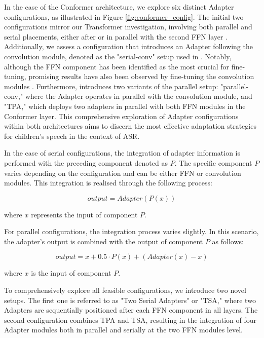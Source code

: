 In the case of the Conformer architecture, we explore six distinct Adapter configurations, as illustrated in Figure \ref{fig:conformer_config}. The initial two configurations mirror our Transformer investigation, involving both parallel and serial placements, either after or in parallel with the second FFN layer \cite{chen2023efficient}. Additionally, we assess a configuration that introduces an Adapter following the convolution module, denoted as the "serial-conv" setup used in \cite{10095837}. Notably, although the FFN component has been identified as the most crucial for fine-tuning, promising results have also been observed by fine-tuning the convolution modules \cite{chen2023efficient}. Furthermore, \cite{chen2023efficient} introduces two variants of the parallel setup: "parallel-conv," where the Adapter operates in parallel with the convolution module, and "TPA," which deploys two adapters in parallel with both FFN modules in the Conformer layer. This comprehensive exploration of Adapter configurations within both architectures aims to discern the most effective adaptation strategies for children's speech in the context of ASR. 


In the case of serial configurations, the integration of adapter information is performed with the preceding component denoted as $P$. The specific component $P$ varies depending on the configuration and can be either FFN or convolution modules. This integration is realised through the following process:

\begin{equation}
    output =  Adapter(P(x))
\end{equation}

where $x$ represents the input of component $P$.

For parallel configurations, the integration process varies slightly. In this scenario, the adapter's output is combined with the output of component $P$ as follows:

\begin{equation}
    output = x + 0.5 \cdot P(x) + (Adapter(x) - x)
\end{equation}

where $x$ is the input of component $P$.

To comprehensively explore all feasible configurations, we introduce two novel setups. The first one is referred to as "Two Serial Adapters" or "TSA," where two Adapters are sequentially positioned after each FFN component in all layers. The second configuration combines TPA and TSA, resulting in the integration of four Adapter modules both in parallel and serially at the two FFN modules level. 

